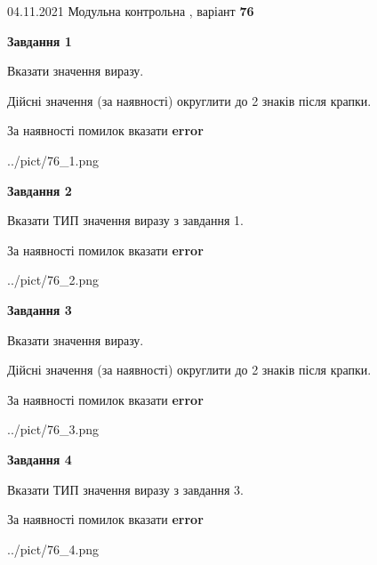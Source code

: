 \documentclass[11pt, ukrainian]{article}
\begin{document}
{04.11.2021 Модульна контрольна , варіант  \No \textbf { 76 }\par}
{
\begin {large}
{\begin {center}\textbf{Завдання 1}\end {center}}\par
Вказати значення виразу. \par
Дійсні значення (за наявності) округлити до 2 знаків після крапки. \par
За наявності помилок вказати \textbf{error}

\begin{center}
	{../pict/76_1.png}
\end{center}
\newpage

{\begin {center}\textbf{Завдання 2}\end {center}}\par
Вказати ТИП значення виразу з завдання 1. \par
За наявності помилок вказати \textbf{error}

\begin{center}
	{../pict/76_2.png}
\end{center}
\newpage

{\begin {center}\textbf{Завдання 3}\end {center}}\par
Вказати значення виразу. \par
Дійсні значення (за наявності) округлити до 2 знаків після крапки. \par
За наявності помилок вказати \textbf{error}

\begin{center}
	{../pict/76_3.png}
\end{center}
\newpage

{\begin {center}\textbf{Завдання 4}\end {center}}\par
Вказати ТИП значення виразу з завдання 3. \par
За наявності помилок вказати \textbf{error}

\begin{center}
	{../pict/76_4.png}
\end{center}
\newpage


\end{large}}
\end{document}
